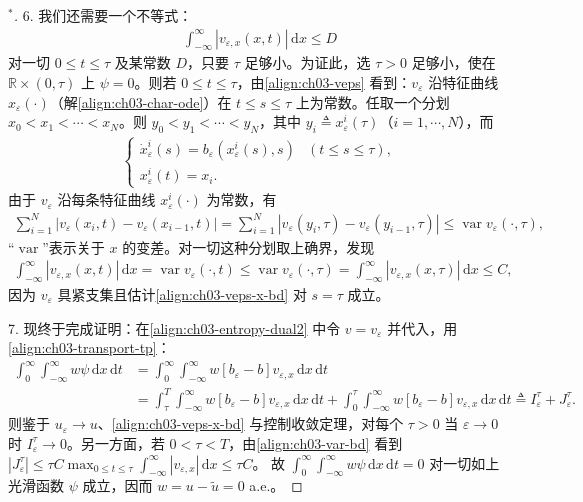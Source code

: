 \documentclass[../../main.tex]{subfiles}
\begin{document}
\begin{proof}[$^*$]
6. 我们还需要一个不等式：
\begin{align}\label{align:ch03-var-bd}
\int_{-\infty}^{\infty}|v_{\varepsilon,x}(x,t)|\,\mathrm{d}x\leqslant D
\end{align}
对一切 $0\leqslant t\leqslant\tau$ 及某常数 $D$，只要 $\tau$ 足够小。为证此，选 $\tau>0$ 足够小，使在 $\mathbb{R}\times(0,\tau)$ 上 $\psi=0$。则若 $0\leqslant t\leqslant\tau$，由\eqref{align:ch03-veps} 看到：$v_\varepsilon$ 沿特征曲线 $x_\varepsilon(\cdot)$（解\eqref{align:ch03-char-ode}）在 $t\leqslant s\leqslant\tau$ 上为常数。任取一个分划 $x_0<x_1<\cdots<x_N$。则 $y_0<y_1<\cdots<y_N$，其中 $y_i\triangleq x_\varepsilon^i(\tau)$（$i=1,\cdots,N$），而
\begin{align*}
\begin{cases}
\dot{x}_\varepsilon^i(s)=b_\varepsilon(x_\varepsilon^i(s),s) & (t\leqslant s\leqslant\tau),\\
x_\varepsilon^i(t)=x_i.
\end{cases}
\end{align*}
由于 $v_\varepsilon$ 沿每条特征曲线 $x_\varepsilon^i(\cdot)$ 为常数，有
\begin{align*}
\sum_{i=1}^N|v_\varepsilon(x_i,t)-v_\varepsilon(x_{i-1},t)|=\sum_{i=1}^N|v_\varepsilon(y_i,\tau)-v_\varepsilon(y_{i-1},\tau)|\leqslant\operatorname{var}v_\varepsilon(\cdot,\tau),
\end{align*}
``$\operatorname{var}$''表示关于 $x$ 的变差。对一切这种分划取上确界，发现
\begin{align*}
\int_{-\infty}^{\infty}|v_{\varepsilon,x}(x,t)|\,\mathrm{d}x=\operatorname{var}v_\varepsilon(\cdot,t)\leqslant\operatorname{var}v_\varepsilon(\cdot,\tau)=\int_{-\infty}^{\infty}|v_{\varepsilon,x}(x,\tau)|\,\mathrm{d}x\leqslant C,
\end{align*}
因为 $v_\varepsilon$ 具紧支集且估计\eqref{align:ch03-veps-x-bd} 对 $s=\tau$ 成立。

7. 现终于完成证明：在\eqref{align:ch03-entropy-dual2} 中令 $v=v_\varepsilon$ 并代入，用\eqref{align:ch03-transport-tp}：
\begin{align*}
\int_0^\infty\int_{-\infty}^{\infty}w\psi\,\mathrm{d}x\,\mathrm{d}t&=\int_0^\infty\int_{-\infty}^{\infty}w[b_\varepsilon-b]v_{\varepsilon,x}\,\mathrm{d}x\,\mathrm{d}t\\
&=\int_\tau^T\int_{-\infty}^{\infty}w[b_\varepsilon-b]v_{\varepsilon,x}\,\mathrm{d}x\,\mathrm{d}t+\int_0^\tau\int_{-\infty}^{\infty}w[b_\varepsilon-b]v_{\varepsilon,x}\,\mathrm{d}x\,\mathrm{d}t
\triangleq I_\varepsilon^\tau+J_\varepsilon^\tau.
\end{align*}
则鉴于 $u_\varepsilon\to u$、\eqref{align:ch03-veps-x-bd} 与控制收敛定理，对每个 $\tau>0$ 当 $\varepsilon\to 0$ 时 $I_\varepsilon^\tau\to 0$。另一方面，若 $0<\tau<T$，由\eqref{align:ch03-var-bd} 看到 $|J_\varepsilon^\tau|\leqslant\tau C\max_{0\leqslant t\leqslant\tau}\int_{-\infty}^{\infty}|v_{\varepsilon,x}|\,\mathrm{d}x\leqslant\tau C$。
故 $\int_0^\infty\int_{-\infty}^{\infty}w\psi\,\mathrm{d}x\,\mathrm{d}t=0$ 对一切如上光滑函数 $\psi$ 成立，因而 $w=u-\widetilde{u}=0$ a.e.。
\end{proof}
\end{document}

